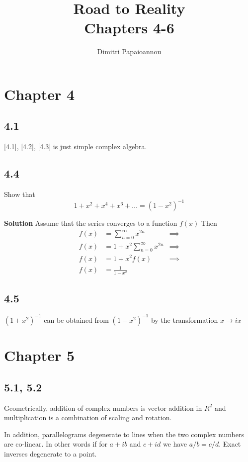 \documentclass[]{article}
\title{Road to Reality\\ Chapters 4-6}
\author{Dimitri Papaioannou}
\begin{document}
\maketitle

\section*{Chapter 4}

\subsection*{4.1}

[4.1], [4.2], [4.3] is just simple complex algebra.



\subsection*{4.4}
Show that
$$
1+x^2+x^4+x^6+... = (1-x^2)^{-1}
$$

\textbf{Solution}
Assume that the series converges to a function $f(x)$
Then
\begin{eqnarray}
f(x) &= \sum_{n=0}^\infty x^{2n} &\implies \\
f(x) &= 1 + x^2\sum_{n=0}^\infty x^{2n} &\implies \\
f(x) &= 1+x^2f(x) &\implies \\
f(x) &= \frac{1}{1-x^2}
\end{eqnarray}


\subsection*{4.5}
$(1+x^2)^{-1}$ can be obtained from $(1-x^2)^{-1}$ by the transformation $x \rightarrow ix$

\section*{Chapter 5}

\subsection*{5.1, 5.2}
Geometrically, addition of complex numbers is vector addition in $R^2$ 
and multiplication is a combination of scaling and rotation.

In addition, parallelograms degenerate to lines when the two complex numbers are co-linear.
In other words if for $a+ib$ and $c+id$ we have $a/b = c/d$. Exact inverses degenerate to a point.
\end{document}
